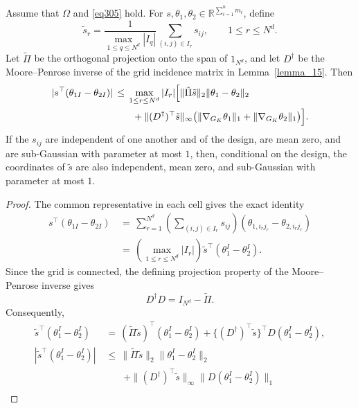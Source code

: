 \documentclass[twoside,11pt]{article}
\newenvironment{revision}{\color{revisionred}}{}
\begin{document}
\begin{revision}
\begin{lemma}
\label{lemma_17}
Assume that $\Omega$ and \eqref{eq305} hold.
For $s,\theta_1,\theta_2\in\mathbb R^{\sum_{i=1}^n m_i}$, define
\[
\tilde s_r=
\frac{1}{\max_{1\leq q\leq N^d}|I_q|}
\sum_{(i,j)\in I_r}s_{ij},\qquad 1\leq r\leq N^d.
\]
Let $\tilde\Pi$ be the orthogonal projection onto the span of
$1_{N^d}$, and let $D^\dag$ be the Moore--Penrose inverse of
the grid incidence matrix in Lemma~\ref{lemma_15}. Then
\begin{equation}
\label{eq:lemma17_result}
\begin{aligned}
|s^\top(\theta_{1I}-\theta_{2I})|
&\,\leq\,\max_{1\leq r\leq N^d}|I_r|
 \Bigl[\|\tilde\Pi\tilde s\|_2\|\theta_1-\theta_2\|_2\\
&\qquad+\|(D^\dag)^\top\tilde s\|_\infty
 \bigl(\|\nabla_{G_K}\theta_1\|_1+
       \|\nabla_{G_K}\theta_2\|_1\bigr)\Bigr].
\end{aligned}
\end{equation}
If the $s_{ij}$ are independent of one another and of the design,
are mean zero, and are sub-Gaussian with parameter at most $1$,
then, conditional on the design, the coordinates of $\tilde s$
are also independent, mean zero, and sub-Gaussian with parameter
at most $1$.
\end{lemma}
\begin{proof}
The common representative in each cell gives the exact identity
\begin{align*}
s^\top(\theta_{1I}-\theta_{2I})
&\,=\,\sum_{r=1}^{N^d}
 \left(\sum_{(i,j)\in I_r}s_{ij}\right)
       (\theta_{1,i_rj_r}-\theta_{2,i_rj_r})\\
&\,=\,\left(\max_{1\leq r\leq N^d}|I_r|\right)
                    \tilde s^\top(\theta_1^I-\theta_2^I).
\end{align*}
Since the grid is connected, the defining projection property
of the Moore--Penrose inverse gives
\[
D^\dag D=I_{N^d}-\tilde\Pi.
\]
Consequently,
\begin{align*}
\tilde s^\top(\theta_1^I-\theta_2^I)
&\,=\,(\tilde\Pi\tilde s)^\top(\theta_1^I-\theta_2^I)
       +\{(D^\dag)^\top\tilde s\}^\top
                                      D(\theta_1^I-\theta_2^I),\\
|\tilde s^\top(\theta_1^I-\theta_2^I)|
&\,\leq\,\|\tilde\Pi\tilde s\|_2\|\theta_1^I-\theta_2^I\|_2\\
&\qquad+\|(D^\dag)^\top\tilde s\|_\infty
                   \|D(\theta_1^I-\theta_2^I)\|_1\\

\end{align*}
\end{proof}
\end{revision}
\end{document}
